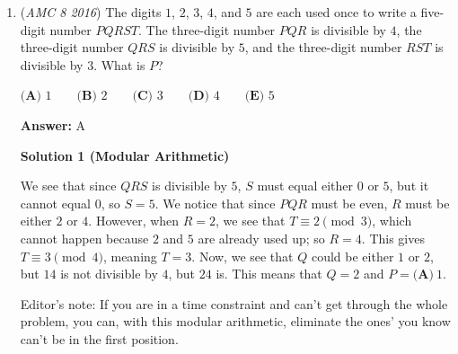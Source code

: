 \begin{enumerate}
 $\textbf{(A) }90\qquad\textbf{(B) }105\qquad\textbf{(C) }120\qquad\textbf{(D) }135\qquad \textbf{(E) }150$

 \textbf{Answer: }C



\textbf{Solution 1}

Observe that $\triangle{EAB}$ is equilateral (all are radii of congruent circles). Therefore, $m\angle{AEB}=m\angle{EAB}=m\angle{EBA} = 60^{\circ}$. Since $CD$ is a straight line, we conclude that $m\angle{EBD} = 180^{\circ}-60^{\circ}=120^{\circ}$. Since $BE=BD$ (both are radii of the same circle), $\triangle{BED}$ is isosceles, meaning that $m\angle{BED}=m\angle{BDE}=30^{\circ}$. Similarly, $m\angle{AEC}=m\angle{ACE}=30^{\circ}$. 

 Now, $\angle{CED}=m\angle{AEC}+m\angle{AEB}+m\angle{BED} = 30^{\circ}+60^{\circ}+30^{\circ} = 120^{\circ}$. Therefore, the answer is $\boxed{\textbf{(C) }\ 120}$.

 \textbf{Graph for Solution 1} \href{https://drive.google.com/file/d/1sNkKxIi7\_SpxihTp0QrOcD3Js14buvd8/view?usp=drivesdk}{https://drive.google.com/file/d/1sNkKxIi7\_SpxihTp0QrOcD3Js14buvd8/view?usp=drivesdk}~ By Quetzalcoatlus

 


	\item (\textit{AMC 8 2016}) The digits $1$, $2$, $3$, $4$, and $5$ are each used once to write a five-digit number $PQRST$. The three-digit number $PQR$ is divisible by $4$, the three-digit number $QRS$ is divisible by $5$, and the three-digit number $RST$ is divisible by $3$. What is $P$?


 $\textbf{(A) }1\qquad\textbf{(B) }2\qquad\textbf{(C) }3\qquad\textbf{(D) }4\qquad \textbf{(E) }5$

 \textbf{Answer: }A



\textbf{Solution 1 (Modular Arithmetic)}

We see that since $QRS$ is divisible by $5$, $S$ must equal either $0$ or $5$, but it cannot equal $0$, so $S=5$. We notice that since $PQR$ must be even, $R$ must be either $2$ or $4$. However, when $R=2$, we see that $T \equiv 2 \pmod{3}$, which cannot happen because $2$ and $5$ are already used up; so $R=4$. This gives $T \equiv 3 \pmod{4}$, meaning $T=3$. Now, we see that $Q$ could be either $1$ or $2$, but $14$ is not divisible by $4$, but $24$ is. This means that $Q=2$ and $P=\boxed{\textbf{(A)}\ 1}$.

 Editor's note: If you are in a time constraint and can't get through the whole problem, you can, with this modular arithmetic,  eliminate the ones' you know can't be in the first position.


\end{enumerate}
